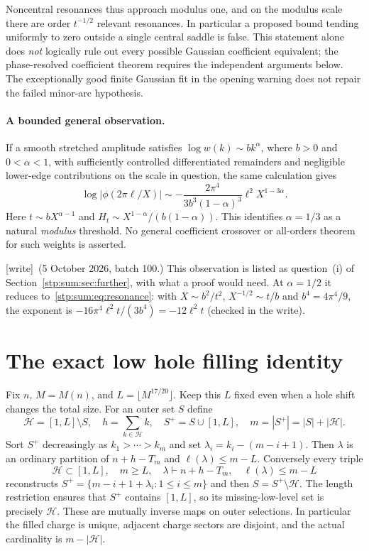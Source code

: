 \documentclass[11pt]{article}
\theoremstyle{remark}\newtheorem{remark}[theorem]{Remark}
\newcommand{\cH}{\mathcal H}
\newcommand{\wtag}{\textup{[write]}}
\begin{document}
Noncentral resonances thus approach modulus one, and on the modulus scale there are order $t^{-1/2}$ relevant resonances. In particular a proposed bound tending uniformly to zero outside a single central saddle is false. This statement alone does \emph{not} logically rule out every possible Gaussian coefficient equivalent; the phase-resolved coefficient theorem requires the independent arguments below. The exceptionally good finite Gaussian fit in the opening warning does not repair the failed minor-arc hypothesis.

\paragraph{A bounded general observation.}
If a smooth stretched amplitude satisfies $\log w(k)\sim b k^\alpha$, where $b>0$ and $0<\alpha<1$, with sufficiently controlled differentiated remainders and negligible lower-edge contributions on the scale in question, the same calculation gives
\[
 \log|\phi(2\pi\ell/X)|\sim
 -\frac{2\pi^4}{3b^3(1-\alpha)^3}\ell^2X^{1-3\alpha}.
\]
Here $t\sim bX^{\alpha-1}$ and $H_t\sim X^{1-\alpha}/(b(1-\alpha))$. This identifies $\alpha=1/3$ as a natural \emph{modulus} threshold. No general coefficient crossover or all-orders theorem for such weights is asserted.

\wtag\ (5 October 2026, batch 100.) This observation is listed as
question~(i) of Section~\ref{stp:sum:sec:further}, with what a proof would
need. At $\alpha=1/2$ it reduces to~\eqref{stp:sum:eq:resonance}: with
$X\sim b^2/t^2$, $X^{-1/2}\sim t/b$ and $b^4=4\pi^4/9$, the exponent is
$-16\pi^4\ell^2t/(3b^4)=-12\ell^2t$ (checked in the write).

\section{The exact low hole filling identity}
\label{stp:sum:sec:filling}
Fix $n$, $M=M(n)$, and $L=\lfloor M^{17/20}\rfloor$. Keep this $L$ fixed even when a hole shift changes the total size. For an outer set $S$ define
\begin{equation}\label{stp:sum:eq:unique}
 \cH=[1,L]\setminus S,\quad h=\sum_{k\in\cH}k,
 \quad S^+=S\cup[1,L],\quad m=|S^+|=|S|+|\cH|.
\end{equation}
Sort $S^+$ decreasingly as $k_1>\cdots>k_m$ and set
$\lambda_i=k_i-(m-i+1)$. Then $\lambda$ is an ordinary partition of $n+h-T_m$ and $\ell(\lambda)\le m-L$. Conversely every triple
\[
 \cH\subset[1,L],\quad m\ge L,\quad
 \lambda\vdash n+h-T_m,\quad \ell(\lambda)\le m-L
\]
reconstructs $S^+=\{m-i+1+\lambda_i:1\le i\le m\}$ and then $S=S^+\setminus\cH$. The length restriction ensures that $S^+$ contains $[1,L]$, so its missing-low-level set is precisely $\cH$. These are mutually inverse maps on outer selections. In particular the filled charge is unique, adjacent charge sectors are disjoint, and the actual cardinality is $m-|\cH|$.
\end{document}

